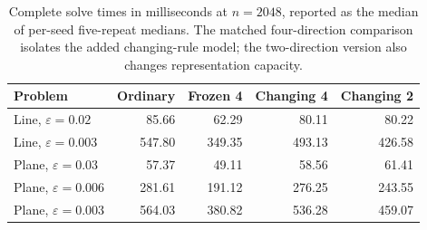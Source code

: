 \begin{table}[!hbp]\centering\small
\begin{tabular}{lrrrr}\toprule
Problem & Ordinary & Frozen 4 & Changing 4 & Changing 2\\\midrule
Line, $\varepsilon=0.02$ & 85.66 & 62.29 & 80.11 & 80.22\\
Line, $\varepsilon=0.003$ & 547.80 & 349.35 & 493.13 & 426.58\\
Plane, $\varepsilon=0.03$ & 57.37 & 49.11 & 58.56 & 61.41\\
Plane, $\varepsilon=0.006$ & 281.61 & 191.12 & 276.25 & 243.55\\
Plane, $\varepsilon=0.003$ & 564.03 & 380.82 & 536.28 & 459.07\\
\bottomrule\end{tabular}
\caption{Complete solve times in milliseconds at $n=2048$, reported as
the median of per-seed five-repeat medians. The matched four-direction
comparison isolates the added changing-rule model; the two-direction
version also changes representation capacity.}\label{tab:entropic-cost}
\end{table}
